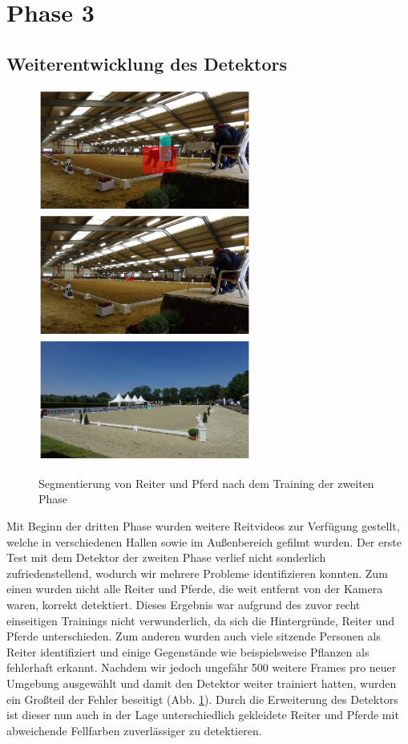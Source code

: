 \section{Phase 3}
\subsection*{Weiterentwicklung des Detektors}

\begin{figure}
\centering
\includegraphics[height=4cm,trim={6cm 0 6cm 0},clip]{./img/IndoorMask6.png}
\includegraphics[height=4cm,trim={6cm 0 6cm 0},clip]{./img/IndoorMask3.png}
\includegraphics[height=4cm,trim={6cm 0 6cm 0},clip]{./img/OutdoorMask2.png}
\caption{Segmentierung von Reiter und Pferd nach dem Training der zweiten Phase}
\label{fig:SegmentierungPhase3}
\end{figure}

Mit Beginn der dritten Phase wurden weitere Reitvideos zur Verfügung gestellt, welche in verschiedenen Hallen sowie im Außenbereich gefilmt wurden. Der erste Test mit dem Detektor der zweiten Phase verlief nicht sonderlich zufriedenstellend, wodurch wir mehrere Probleme identifizieren konnten. Zum einen wurden nicht alle Reiter und Pferde, die weit entfernt von der Kamera waren, korrekt detektiert. Dieses Ergebnis war aufgrund des zuvor recht einseitigen Trainings nicht verwunderlich, da sich die Hintergründe, Reiter und Pferde unterschieden. Zum anderen wurden auch viele sitzende Personen als Reiter identifiziert und einige Gegenstände wie beispielsweise Pflanzen als fehlerhaft erkannt. Nachdem wir jedoch ungefähr 500 weitere Frames pro neuer Umgebung ausgewählt und damit den Detektor weiter trainiert hatten, wurden ein Großteil der Fehler beseitigt (Abb. \ref{fig:SegmentierungPhase3}). Durch die Erweiterung des Detektors ist dieser nun auch in der Lage unterschiedlich gekleidete Reiter und Pferde mit abweichende Fellfarben zuverlässiger zu detektieren.


